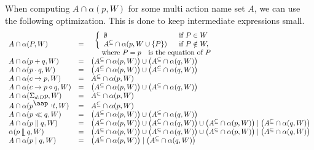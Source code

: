 \documentclass{article}
\begin{document}
When computing $A\cap \alpha (p,W)$ for some multi action name set $A$, we
can use the following optimization. This is done to keep intermediate
expressions small.%
\[
\begin{array}{lll}
A\cap \alpha (P,W) & = & 
\begin{array}{l}
\left\{ 
\begin{array}{ll}
\emptyset  & \text{if }P\in W \\ 
A^{\subseteq }\cap \alpha (p,W\cup \{P\}) & \text{if }P\notin W,%
\end{array}%
\right.  \\ 
\text{ where }P=p\text{ is the equation of }P%
\end{array}
\\ 
A\cap \alpha (p+q,W) & = & \left( A^{\subseteq }\cap \alpha (p,W)\right)
\cup \left( A^{\subseteq }\cap \alpha (q,W)\right)  \\ 
A\cap \alpha (p\cdot q,W) & = & \left( A^{\subseteq }\cap \alpha
(p,W)\right) \cup \left( A^{\subseteq }\cap \alpha (q,W)\right)  \\ 
A\cap \alpha (c\rightarrow p,W) & = & A^{\subseteq }\cap \alpha (p,W) \\ 
A\cap \alpha (c\rightarrow p\diamond q,W) & = & \left( A^{\subseteq }\cap
\alpha (p,W)\right) \cup \left( A^{\subseteq }\cap \alpha (q,W)\right)  \\ 
A\cap \alpha (\Sigma _{d:D}p,W) & = & A^{\subseteq }\cap \alpha (p,W) \\ 
A\cap \alpha (p^{\mathbin{\mbox{\aap
,}}}t,W) & = & A^{\subseteq }\cap \alpha (p,W) \\ 
A\cap \alpha (p\ll q,W) & = & \left( A^{\subseteq }\cap \alpha (p,W)\right)
\cup \left( A^{\subseteq }\cap \alpha (q,W)\right)  \\ 
A\cap \alpha (p\parallel q,W) & = & \left( A^{\subseteq }\cap \alpha
(p,W)\right) \cup \left( A^{\subseteq }\cap \alpha (q,W)\right) \cup \left(
A^{\subseteq }\cap \alpha (p,W)\right) \mid \left( A^{\subseteq }\cap \alpha
(q,W)\right)  \\ 
\alpha (p\mathbin{\mathrel{\llfloor}}q,W) & = & \left( A^{\subseteq }\cap
\alpha (p,W)\right) \cup \left( A^{\subseteq }\cap \alpha (q,W)\right) \cup
\left( A^{\subseteq }\cap \alpha (p,W)\right) \mid \left( A^{\subseteq }\cap
\alpha (q,W)\right)  \\ 
A\cap \alpha (p\mid q,W) & = & \left( A^{\subseteq }\cap \alpha (p,W)\right)
\mid \left( A^{\subseteq }\cap \alpha (q,W)\right) 
\end{array}%
\]
\end{document}
